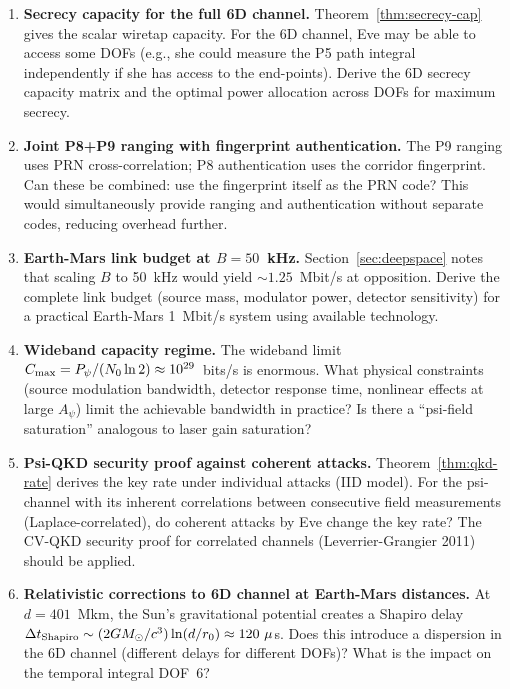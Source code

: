 \documentclass[aps,prd,twocolumn,superscriptaddress,nofootinbib]{revtex4-2}
\begin{document}
\begin{enumerate}

\item \textbf{Secrecy capacity for the full 6D channel.}
Theorem~\ref{thm:secrecy-cap} gives the scalar wiretap capacity.
For the 6D channel, Eve may be able to access some DOFs (e.g., she
could measure the P5 path integral independently if she has access to
the end-points). Derive the 6D secrecy capacity matrix and the
optimal power allocation across DOFs for maximum secrecy.

\item \textbf{Joint P8+P9 ranging with fingerprint authentication.}
The P9 ranging uses PRN cross-correlation; P8 authentication uses the
corridor fingerprint. Can these be combined: use the fingerprint itself
as the PRN code? This would simultaneously provide ranging and
authentication without separate codes, reducing overhead further.

\item \textbf{Earth-Mars link budget at $B = 50$~kHz.}
Section~\ref{sec:deepspace} notes that scaling $B$ to 50~kHz would
yield $\sim 1.25$~Mbit/s at opposition. Derive the complete link budget
(source mass, modulator power, detector sensitivity) for a practical
Earth-Mars 1~Mbit/s system using available technology.

\item \textbf{Wideband capacity regime.}
The wideband limit $C_{\rm max} = P_\psi/(N_0\ln 2) \approx 10^{29}$~bits/s
is enormous. What physical constraints (source modulation bandwidth,
detector response time, nonlinear effects at large $A_\psi$) limit
the achievable bandwidth in practice? Is there a ``psi-field saturation''
analogous to laser gain saturation?

\item \textbf{Psi-QKD security proof against coherent attacks.}
Theorem~\ref{thm:qkd-rate} derives the key rate under individual attacks
(IID model). For the psi-channel with its inherent correlations between
consecutive field measurements (Laplace-correlated), do coherent attacks
by Eve change the key rate? The CV-QKD security proof for correlated
channels (Leverrier-Grangier 2011) should be applied.

\item \textbf{Relativistic corrections to 6D channel at Earth-Mars distances.}
At $d = 401$~Mkm, the Sun's gravitational potential creates a Shapiro
delay $\Delta t_{\rm Shapiro} \sim (2GM_\odot/c^3)\ln(d/r_0) \approx 120~\mu$s.
Does this introduce a dispersion in the 6D channel (different delays for
different DOFs)? What is the impact on the temporal integral DOF~6?

\end{enumerate}
\end{document}
